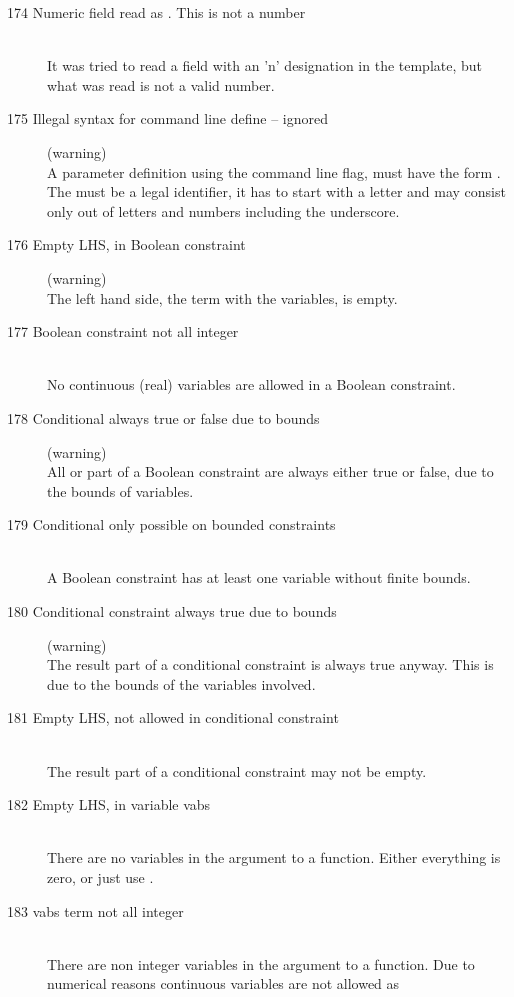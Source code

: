 \begin{description}
%
%
\item[174 Numeric field  read as . This is not a
  number]\ \\
  It was tried to read a field with an 'n' designation in the template,
  but what was read is not a valid number.
%
%
\item[175 Illegal syntax for command line define  --
  ignored] (warning)\\
  A parameter definition using the command line  flag, must
  have the form . The  must be a legal
  identifier, \ie it has to start with a letter and may consist only out
  of letters and numbers including the underscore. 
%
%
\item[176 Empty LHS, in Boolean constraint] (warning)\ \\
   The left hand side, \ie the term with the variables, is empty. 
\item[177 Boolean constraint not all integer]\ \\
   No continuous (real) variables are allowed in a Boolean constraint.
\item[178 Conditional always true or false due to bounds] (warning)\ \\
   All or part of a Boolean constraint are always either true or
   false, due to the bounds of variables.
\item[179 Conditional only possible on bounded constraints]\ \\
   A Boolean constraint has at least one variable without finite bounds.
\item[180 Conditional constraint always true due to bounds] (warning)\ \\
   The result part of a conditional constraint is always true anyway. 
   This is due to the bounds of the variables involved.
\item[181 Empty LHS, not allowed in conditional constraint]\ \\
   The result part of a conditional constraint may not be empty.
\item[182 Empty LHS, in variable vabs]\ \\
   There are no variables in the argument to a  function.
   Either everything is zero, or just use .
\item[183 vabs term not all integer]\ \\
   There are non integer variables in the argument to a  function.
   Due to numerical reasons continuous variables are not allowed as

\end{description}
